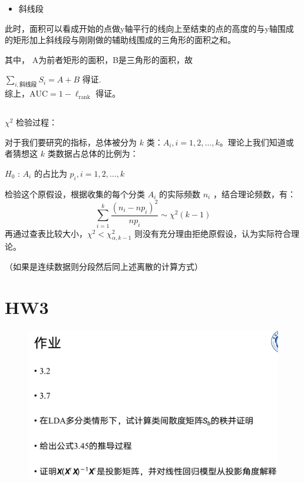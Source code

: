 \documentclass[UTF8,a4paper,AutoFakeBold,AutoFakeSlant]{article}
\begin{document}
\begin{itemize}
  \item 斜线段
\end{itemize}
此时，面积可以看成开始的点做y轴平行的线向上至结束的点的高度的与y轴围成的矩形加上斜线段与刚刚做的辅助线围成的三角形的面积之和。

其中， A为前者矩形的面积，B是三角形的面积，故

$ \sum_{i,\text{斜线段}} S_i  = A+B $ 得证.
\\

综上，$ \text{AUC} = 1-\ell_{\mathrm{rank}} $ 得证。



\subsection{}
$\chi^2 $ 检验过程：

对于我们要研究的指标，总体被分为 $k$ 类：$ A_i, i=1, 2, \dots, k $。理论上我们知道或者猜想这 $k$ 类数据占总体的比例为：

$H_0$ : $A_i$ 的占比为 $p_i, i = 1, 2, \dots, k$

检验这个原假设，根据收集的每个分类 $A_i$ 的实际频数 $n_i$ ，结合理论频数，有：
\begin{equation*}
  \sum_{i=1}^{k} \frac{\left(n_{i}-n p_{i}\right)^{2}}{n p_{i}} \sim \chi^{2}(k-1)
\end{equation*}
再通过查表比较大小，$\chi^{2}<\chi_{\alpha, k-1}^{2}$ 则没有充分理由拒绝原假设，认为实际符合理论。

（如果是连续数据则分段然后同上述离散的计算方式）






\section{HW3}
\begin{figure}[H]
  \centering
  \includegraphics[scale=0.35]{hw3.png}
  \label{f5}
\end{figure}
\end{document}
